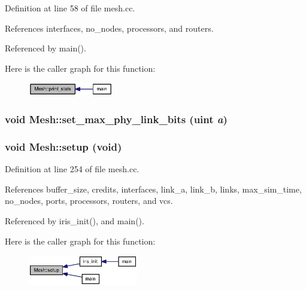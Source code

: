 Definition at line 58 of file mesh.cc.

References interfaces, no\_\-nodes, processors, and routers.

Referenced by main().

Here is the caller graph for this function:\nopagebreak
\begin{figure}[H]
\begin{center}
\leavevmode
\includegraphics[width=105pt]{classMesh_eea84429f858784c6232e5633603fdf8_icgraph}
\end{center}
\end{figure}
\subsubsection[{set\_\-max\_\-phy\_\-link\_\-bits}]{\setlength{\rightskip}{0pt plus 5cm}void Mesh::set\_\-max\_\-phy\_\-link\_\-bits ({\bf uint} {\em a})}\label{classMesh_592b6fea06d0348e4c18f2e43d8d051d}


\subsubsection[{setup}]{\setlength{\rightskip}{0pt plus 5cm}void Mesh::setup (void)}\label{classMesh_5c83ba3ef93b8ab63084b9c45082c7e9}




Definition at line 254 of file mesh.cc.

References buffer\_\-size, credits, interfaces, link\_\-a, link\_\-b, links, max\_\-sim\_\-time, no\_\-nodes, ports, processors, routers, and vcs.

Referenced by iris\_\-init(), and main().

Here is the caller graph for this function:\nopagebreak
\begin{figure}[H]
\begin{center}
\leavevmode
\includegraphics[width=136pt]{classMesh_5c83ba3ef93b8ab63084b9c45082c7e9_icgraph}
\end{center}
\end{figure}


